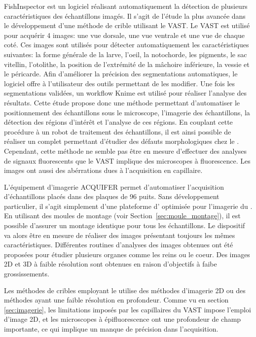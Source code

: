 \documentclass[\main/main.tex]{subfiles}
\begin{document}
FishInspector\cite{teixid_2019} est un logiciel réalisant automatiquement la détection de plusieurs caractéristiques des échantillons imagés.
%
Il s'agit de l'étude la plus avancée dans le développement d'une méthode de crible utilisant le VAST.
%
Le VAST est utilisé pour acquérir 4 images: une vue dorsale, une vue ventrale et une vue de chaque coté.
%
Ces images sont utilisés pour détecter automatiquement les caractéristiques suivantes:
%
la forme générale de la larve,
l'oeil,
la notochorde,
les pigments,
le sac vitellin,
l'otolithe,
la position de l'extrémité de la mâchoire inférieure,
la vessie et le péricarde.
%
Afin d'améliorer la précision des segmentations automatiques,
le logiciel offre à l'utilisateur des outils permettant de les modifier.
%
Une fois les segmentations validées, un workflow Knime est utilisé pour réaliser l'analyse des résultats.
%
Cette étude propose donc une méthode permettant d'automatiser le positionnement des échantillons sous le microscope, l'imagerie des échantillons, la détection des régions d'intérêt et l'analyse de ces régions.
%
En couplant cette procédure à un robot de traitement des échantillons, il est ainsi possible de réaliser un \hcs{} complet permettant d'étudier des défauts morphologiques chez le \pz{}.
%
Cependant, cette méthode ne semble pas être en mesure d'effectuer des analyses de signaux fluorescents que le VAST implique des microscopes à fluorescence. Les images ont aussi des abérrations dues à l'acquisition en capillaire.

%
L'équipement d'imagerie ACQUIFER permet d'automatiser l'acquisition d'échantillons placés dans des plaques de 96 puits.
%
Sans développement particulier, il s'agit simplement d'une plateforme d'\hti{} optimisée pour l'imagerie du \pz{}.
%
En utilisant des moules de montage\cite{wittbrodt_2014} (voir Section~\ref{sec:moule_montage}), il est possible d'assurer un montage identique pour tous les échantillons.
%
Le dispositif va alors être en mesure de réaliser des images présentant toujours les mêmes caractéristiques.
%
Différentes routines d'analyses des images obtenues ont été proposées pour étudier plusieurs organes comme les reins ou le coeur\cite{westhoff_2020, steenbergen_2020, pandey_2019}. Des images 2D et 3D à faible résolution sont obtenues en raison d'objectifs à faibe grossissements.

%
Les méthodes de cribles employant le \pz{} utilise des méthodes d'imagerie 2D ou des méthodes ayant une faible résolution en profondeur.
%
Comme vu en section \ref{sec:imagerie}, les limitations imposés par les capillaires du VAST impose l'emploi d'image 2D, et les microscopes à épifluorescence ont une profondeur de champ importante, ce qui implique un manque de précision dans l'acquisition.
\end{document}
